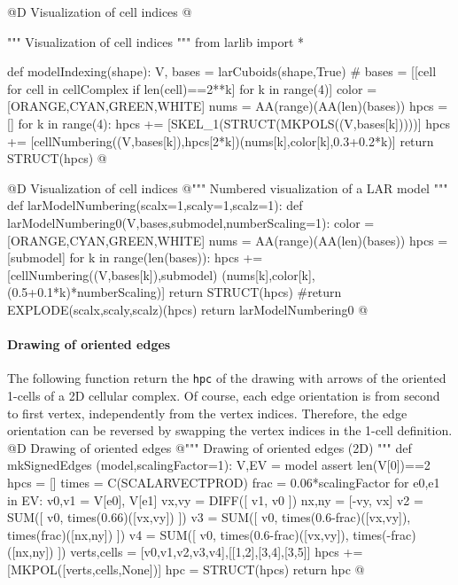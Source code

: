 \documentclass[11pt,oneside]{article}    %
\begin{document}
@D Visualization of cell indices
@{""" Visualization of cell indices """
from larlib import *

def modelIndexing(shape):
    V, bases = larCuboids(shape,True)
    # bases = [[cell for cell in cellComplex if len(cell)==2**k] for k in range(4)]
    color = [ORANGE,CYAN,GREEN,WHITE]
    nums = AA(range)(AA(len)(bases))
    hpcs = []
    for k in range(4):
        hpcs += [SKEL_1(STRUCT(MKPOLS((V,bases[k]))))]
        hpcs += [cellNumbering((V,bases[k]),hpcs[2*k])(nums[k],color[k],0.3+0.2*k)]
    return STRUCT(hpcs)
@}


@D Visualization of cell indices
@{""" Numbered visualization of a LAR model """
def larModelNumbering(scalx=1,scaly=1,scalz=1):
    def  larModelNumbering0(V,bases,submodel,numberScaling=1):
        color = [ORANGE,CYAN,GREEN,WHITE]
        nums = AA(range)(AA(len)(bases))
        hpcs = [submodel]
        for k in range(len(bases)):
            hpcs += [cellNumbering((V,bases[k]),submodel)
                        (nums[k],color[k],(0.5+0.1*k)*numberScaling)]
        return STRUCT(hpcs)
        #return EXPLODE(scalx,scaly,scalz)(hpcs)
    return larModelNumbering0
@}



\paragraph{Drawing of oriented edges}
The following function return the \texttt{hpc} of the drawing with arrows of the oriented 1-cells of a 2D cellular complex. Of course, each edge orientation is from second to first vertex, independently from the vertex indices. Therefore, the edge orientation can be reversed by swapping the vertex indices in the 1-cell definition. 
@D Drawing of oriented edges
@{""" Drawing of oriented edges (2D) """
def mkSignedEdges (model,scalingFactor=1):
    V,EV = model
    assert len(V[0])==2
    hpcs = []
    times = C(SCALARVECTPROD)
    frac = 0.06*scalingFactor
    for e0,e1 in EV:
        v0,v1 = V[e0], V[e1]
        vx,vy = DIFF([ v1, v0 ])
        nx,ny = [-vy, vx]
        v2 = SUM([ v0, times(0.66)([vx,vy]) ])
        v3 = SUM([ v0, times(0.6-frac)([vx,vy]), times(frac)([nx,ny]) ])
        v4 = SUM([ v0, times(0.6-frac)([vx,vy]), times(-frac)([nx,ny]) ])
        verts,cells = [v0,v1,v2,v3,v4],[[1,2],[3,4],[3,5]]
        hpcs += [MKPOL([verts,cells,None])]
    hpc = STRUCT(hpcs)
    return hpc
@}
\end{document}
